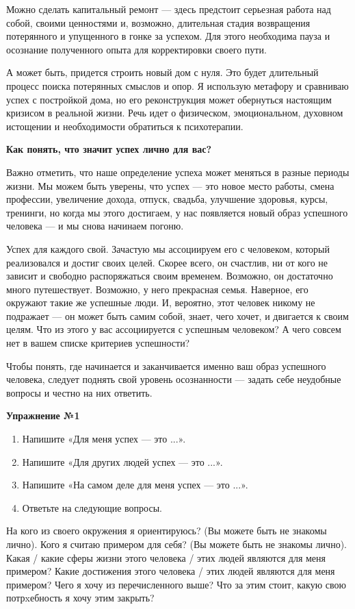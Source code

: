 Можно сделать капитальный ремонт — здесь предстоит серьезная работа над собой, своими ценностями и, возможно, длительная стадия возвращения потерянного и упущенного в гонке за успехом. Для этого необходима пауза и осознание полученного опыта для корректировки своего пути.

А может быть, придется строить новый дом с нуля. Это будет длительный процесс поиска потерянных смыслов и опор. Я использую метафору и сравниваю успех с постройкой дома, но его реконструкция может обернуться настоящим кризисом в реальной жизни. Речь идет о физическом, эмоциональном, духовном истощении и необходимости обратиться к психотерапии.

\textbf{Как понять, что значит успех лично для вас?}

Важно отметить, что наше определение успеха может меняться в разные периоды жизни. Мы можем быть уверены, что успех — это новое место работы, смена профессии, увеличение дохода, отпуск, свадьба, улучшение здоровья, курсы, тренинги, но когда мы этого достигаем, у нас появляется новый образ успешного человека — и мы снова начинаем погоню.

Успех для каждого свой. Зачастую мы ассоциируем его с человеком, который реализовался и достиг своих целей. Скорее всего, он счастлив, ни от кого не зависит и свободно распоряжаться своим временем. Возможно, он достаточно много путешествует. Возможно, у него прекрасная семья. Наверное, его окружают такие же успешные люди. И, вероятно, этот человек никому не подражает — он может быть самим собой, знает, чего хочет, и двигается к своим целям. Что из этого у вас ассоциируется с успешным человеком? А чего совсем нет в вашем списке критериев успешности?

Чтобы понять, где начинается и заканчивается именно ваш образ успешного человека, следует поднять свой уровень осознанности — задать себе неудобные вопросы и честно на них ответить.

\textbf{Упражнение №1}

\begin{enumerate}
    \item Напишите «Для меня успех — это ...».
    \item Напишите «Для других людей успех — это  ...».
    \item Напишите «На самом деле для меня успех — это ...».
    \item Ответьте на следующие вопросы.
\end{enumerate}

На кого из своего окружения я ориентируюсь? (Вы можете быть не знакомы лично). Кого я считаю примером для себя? (Вы можете быть не знакомы лично).
Какая / какие сферы жизни этого человека / этих людей являются для меня примером? Какие достижения этого человека / этих людей являются для меня примером? Чего я хочу из перечисленного выше?
Что за этим стоит, какую свою потрxебность я хочу этим закрыть?

